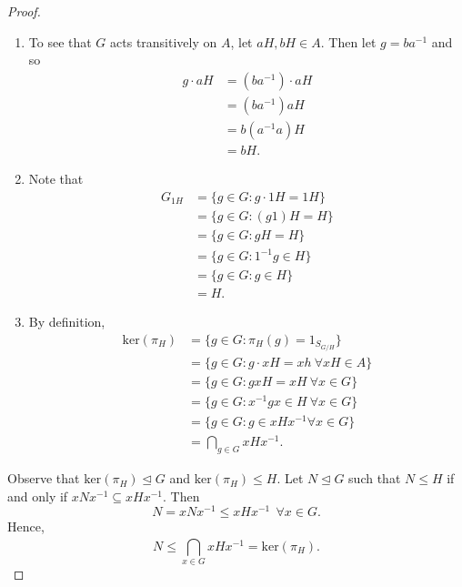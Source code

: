 \begin{proof}
\begin{enumerate}
    \item[(a)] To see that \( G  \) acts transitively on \( A  \), let \( a H , b H \in A  \). Then let \( g = b a^{-1}  \) and so 
        \begin{align*}
           g \cdot a H  &= (b a^{-1})\cdot aH  \\
                        &= (b a^{-1}) aH \\
                        &= b (a^{-1}a) H  \\
                        &= b H. 
        \end{align*}
    \item[(b)] Note that 
        \begin{align*}
            {G}_{1H} &= \{  g \in G : g \cdot 1 H  = 1 H  \}  \\
                     &= \{  g \in G : (g1)H = H  \}  \\
                     &= \{  g \in G : g H  = H  \} \\
                     &= \{  g \in G  : 1^{-1} g \in H  \}  \\
                     &= \{  g \in G  : g \in H  \}  \\
                     &= H. 
        \end{align*}
    \item[(c)] By definition, 
        \begin{align*}
            \text{ker}({\pi}_{H}) &= \{  g \in G : {\pi}_{H}(g) = {1}_{{S}_{G /H}} \}   \\
                                  &= \{  g \in G : g \cdot x H = x h \ \forall xH \in A  \} \\
                                  &= \{  g \in G  : g x H = x H \ \forall x \in G   \} \\ 
                                  &= \{  g \in G : x^{-1} g x \in H  \ \forall x \in G  \}  \\
                                  &= \{  g \in G : g \in x H x^{-1} \forall x \in G  \}  \\
                                  &= \bigcap_{ g \in G  }^{  } x H x^{-1}. 
    \end{align*}
\end{enumerate}
Observe that  \( \text{ker}({\pi}_{H}) \trianglelefteq G  \) and \( \text{ker}({\pi}_{H}) \leq H  \). Let \( N \trianglelefteq G  \) such that \( N \leq H  \) if and only if \( x N x^{-1} \subseteq  x H x^{-1} \). Then 
\[  N = x N x^{-1} \leq x H x^{-1} \ \ \forall  x \in G. \]
Hence, 
\[  N \leq \bigcap_{  x \in G  }^{  }  x H x^{-1} = \text{ker}({\pi}_{H}). \]

\end{proof}


